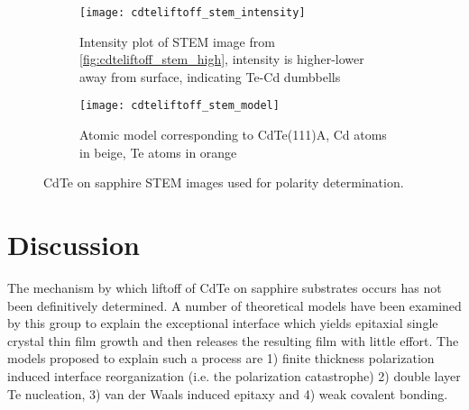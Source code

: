 \begin{figure}
    \centering
    \begin{subfigure}[t]{0.50\textwidth}
        \centering \texttt{[image: cdteliftoff\_stem\_intensity]}
        \caption{\label{fig:cdteliftoff_stem_intensity}Intensity plot of STEM image from \cref{fig:cdteliftoff_stem_high}, intensity is higher-lower away from surface, indicating Te-Cd dumbbells}
    \end{subfigure}\quad%
    \begin{subfigure}[t]{0.45\textwidth}
        \centering \texttt{[image: cdteliftoff\_stem\_model]}
        \caption{\label{fig:cdteliftoff_stem_model}Atomic model corresponding to CdTe(111)A, Cd atoms in beige, Te atoms in orange}
    \end{subfigure}%
    \caption{\label{fig:cdteliftoff_stem2}CdTe on sapphire STEM images used for polarity determination.}
\end{figure}
%

\section{Discussion}
The mechanism by which liftoff of CdTe on sapphire substrates occurs has not been definitively determined.
A number of theoretical models have been examined by this group to explain the exceptional interface which yields epitaxial single crystal thin film growth and then releases the resulting film with little effort.
The models proposed to explain such a process are 1) finite thickness polarization induced interface reorganization (i.e. the polarization catastrophe) 2) double layer Te nucleation, 3) van der Waals induced epitaxy and 4) weak covalent bonding.


